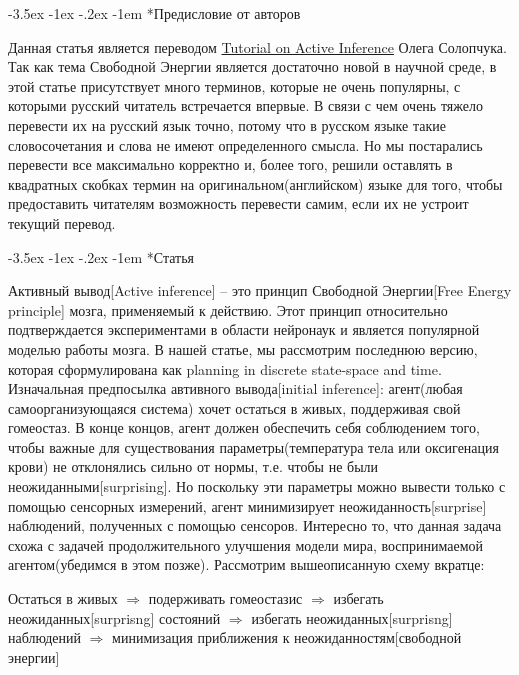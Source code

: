 \documentclass[twoside,leqno, 11pt]{article}
\author{Махнева Елизавета, Брсикян Бабкен \\ БЭК171}
\makeatletter
\renewcommand\section{\@startsection{section}{1}{\z@}%
        {-3.5ex \@plus -1ex \@minus -.2ex}%
        {-1em}%
        {\normalfont\large\scshape\bfseries}}
\makeatother
\begin{document}
	
\section*{Предисловие от авторов}~\

	Данная статья является переводом \href{https://medium.com/@solopchuk/tutorial-on-active-inference-30edcf50f5dc}{Tutorial on Active Inference} Олега Солопчука. Так как тема Свободной Энергии является достаточно новой в научной среде, в этой статье присутствует много терминов, которые не очень популярны, с которыми русский читатель встречается впервые. В связи с чем очень тяжело перевести их на русский язык точно, потому что в русском языке такие словосочетания и слова не имеют определенного смысла. Но мы постарались перевести все максимально корректно и, более того, решили оставлять в квадратных скобках термин на оригинальном(английском) языке для того, чтобы предоставить читателям возможность перевести самим, если их не устроит текущий перевод.

\section*{Статья}~\

	Активный вывод[Active inference] -- это принцип Свободной Энергии[Free Energy principle] мозга, применяемый к действию. Этот принцип относительно подтверждается экспериментами в области нейронаук и является популярной моделью работы мозга. В нашей статье, мы рассмотрим последнюю версию, которая сформулирована как planning in discrete state-space and time. Изначальная предпосылка автивного вывода[initial inference]: агент(любая самоорганизующаяся система) хочет остаться в живых, поддерживая свой гомеостаз. В конце концов, агент должен обеспечить себя соблюдением того, чтобы важные для существования параметры(температура тела или оксигенация крови) не отклонялись сильно от нормы, т.е. чтобы не были неожиданными[surprising]. Но поскольку эти параметры можно вывести только с помощью сенсорных измерений, агент минимизирует неожиданность[surprise] наблюдений, полученных с помощью сенсоров. Интересно то, что данная задача схожа с задачей продолжительного улучшения модели мира, воспринимаемой агентом(убедимся в этом позже). Рассмотрим вышеописанную схему вкратце:
	
\begin{center}
	Остаться в живых $\Rightarrow$ подерживать гомеостазис $\Rightarrow$ избегать неожиданных[surprisng] состояний $\Rightarrow$ избегать неожиданных[surprisng] наблюдений $\Rightarrow$ минимизация приближения к неожиданностям[свободной энергии]
\end{center}
	
\end{document}
